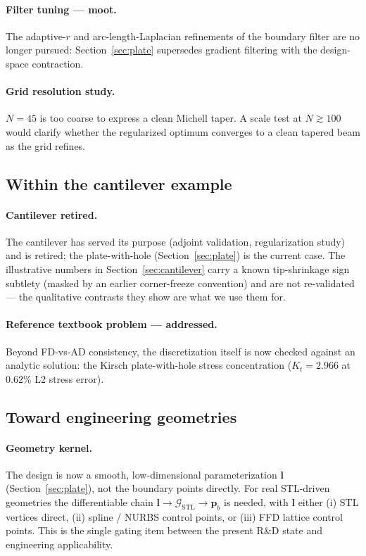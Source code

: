 \documentclass[11pt,a4paper]{article}
\newcommand{\vect}[1]{\boldsymbol{#1}}
\newcommand{\pts}{\vect{p}}
\begin{document}
\paragraph{Filter tuning --- moot.}
The adaptive-$r$ and arc-length-Laplacian refinements of the boundary filter are no
longer pursued: Section~\ref{sec:plate} supersedes gradient filtering with the
design-space contraction.

\paragraph{Grid resolution study.}
$N = 45$ is too coarse to express a clean Michell taper. A scale
test at $N \gtrsim 100$ would clarify whether the regularized
optimum converges to a clean tapered beam as the grid refines.

\subsection{Within the cantilever example}

\paragraph{Cantilever retired.}
The cantilever has served its purpose (adjoint validation, regularization study) and
is retired; the plate-with-hole (Section~\ref{sec:plate}) is the current case. The
illustrative numbers in Section~\ref{sec:cantilever} carry a known tip-shrinkage sign
subtlety (masked by an earlier corner-freeze convention) and are not re-validated ---
the qualitative contrasts they show are what we use them for.

\paragraph{Reference textbook problem --- addressed.}
Beyond FD-vs-AD consistency, the discretization itself is now checked against an
analytic solution: the Kirsch plate-with-hole stress concentration
($K_t = 2.966$ at $0.62\%$ L2 stress error).

\subsection{Toward engineering geometries}

\paragraph{Geometry kernel.}
The design is now a smooth, low-dimensional parameterization $\vect l$
(Section~\ref{sec:plate}), not the boundary points directly. For
real STL-driven geometries the differentiable chain
$\vect l \to \mathcal G_{\text{STL}} \to \pts_b$ is needed, with
$\vect l$ either (i) STL vertices direct, (ii) spline / NURBS
control points, or (iii) FFD lattice control points. This is the
single gating item between the present R\&D state and engineering
applicability.
\end{document}
